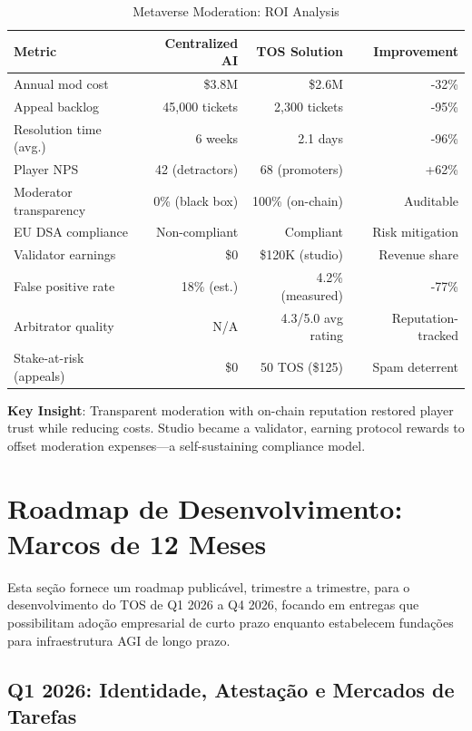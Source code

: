 \documentclass[11pt]{article}
\begin{document}
\begin{itemize}[noitemsep]
\begin{itemize}[noitemsep]
\begin{itemize}[noitemsep]
\begin{table}[H]
\centering
\caption{Metaverse Moderation: ROI Analysis}
\label{tab:metaverse-roi}
\begin{tabular}{@{}lrrr@{}}
\toprule
\textbf{Metric} & \textbf{Centralized AI} & \textbf{TOS Solution} & \textbf{Improvement} \\ \midrule
Annual mod cost & \$3.8M & \$2.6M & -32\% \\
Appeal backlog & 45,000 tickets & 2,300 tickets & -95\% \\
Resolution time (avg.) & 6 weeks & 2.1 days & -96\% \\
Player NPS & 42 (detractors) & 68 (promoters) & +62\% \\
Moderator transparency & 0\% (black box) & 100\% (on-chain) & Auditable \\
EU DSA compliance & Non-compliant & Compliant & Risk mitigation \\
Validator earnings & \$0 & \$120K (studio) & Revenue share \\
False positive rate & 18\% (est.) & 4.2\% (measured) & -77\% \\
Arbitrator quality & N/A & 4.3/5.0 avg rating & Reputation-tracked \\
Stake-at-risk (appeals) & \$0 & 50 TOS (\$125) & Spam deterrent \\
\bottomrule
\end{tabular}
\end{table}

\textbf{Key Insight}: Transparent moderation with on-chain reputation restored player trust while reducing costs. Studio became a validator, earning protocol rewards to offset moderation expenses—a self-sustaining compliance model.

\section{Roadmap de Desenvolvimento: Marcos de 12 Meses}
\label{sec:12month-roadmap}

Esta seção fornece um roadmap publicável, trimestre a trimestre, para o desenvolvimento do TOS de Q1 2026 a Q4 2026, focando em entregas que possibilitam adoção empresarial de curto prazo enquanto estabelecem fundações para infraestrutura AGI de longo prazo.

\subsection{Q1 2026: Identidade, Atestação e Mercados de Tarefas}


\end{itemize}
\end{itemize}
\end{itemize}
\end{document}
